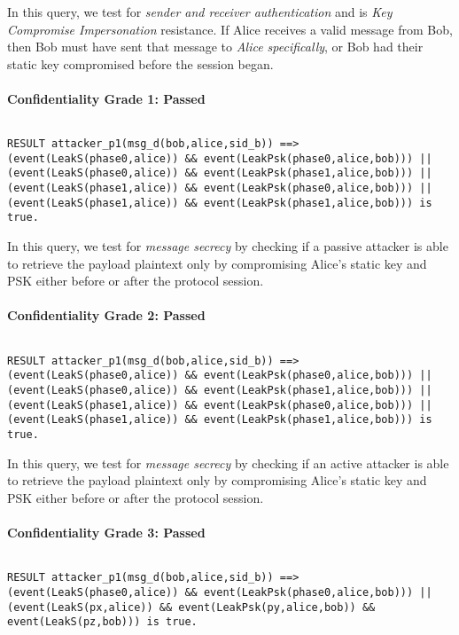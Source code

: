 In this query, we test for \emph{sender and receiver authentication} and is \emph{Key Compromise Impersonation} resistance. If Alice receives a valid message from Bob, then Bob must have sent that message to \emph{Alice specifically}, or Bob had their static key compromised before the session began.


\paragraph{Confidentiality Grade 1: Passed}$ $
\begin{lstlisting}
RESULT attacker_p1(msg_d(bob,alice,sid_b)) ==> (event(LeakS(phase0,alice)) && event(LeakPsk(phase0,alice,bob))) || (event(LeakS(phase0,alice)) && event(LeakPsk(phase1,alice,bob))) || (event(LeakS(phase1,alice)) && event(LeakPsk(phase0,alice,bob))) || (event(LeakS(phase1,alice)) && event(LeakPsk(phase1,alice,bob))) is true.
\end{lstlisting}

In this query, we test for \emph{message secrecy} by checking if a passive attacker is able to retrieve the payload plaintext only by compromising Alice's static key and PSK either before or after the protocol session.


\paragraph{Confidentiality Grade 2: Passed}$ $
\begin{lstlisting}
RESULT attacker_p1(msg_d(bob,alice,sid_b)) ==> (event(LeakS(phase0,alice)) && event(LeakPsk(phase0,alice,bob))) || (event(LeakS(phase0,alice)) && event(LeakPsk(phase1,alice,bob))) || (event(LeakS(phase1,alice)) && event(LeakPsk(phase0,alice,bob))) || (event(LeakS(phase1,alice)) && event(LeakPsk(phase1,alice,bob))) is true.
\end{lstlisting}

In this query, we test for \emph{message secrecy} by checking if an active attacker is able to retrieve the payload plaintext only by compromising Alice's static key and PSK either before or after the protocol session.


\paragraph{Confidentiality Grade 3: Passed}$ $
\begin{lstlisting}
RESULT attacker_p1(msg_d(bob,alice,sid_b)) ==> (event(LeakS(phase0,alice)) && event(LeakPsk(phase0,alice,bob))) || (event(LeakS(px,alice)) && event(LeakPsk(py,alice,bob)) && event(LeakS(pz,bob))) is true.
\end{lstlisting}

